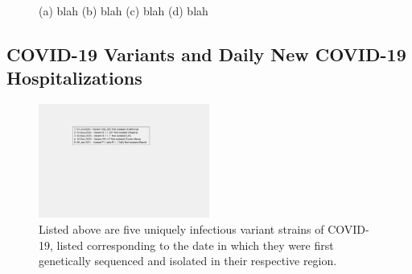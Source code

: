 \documentclass[]{article}
\begin{document}
\begin{figure}
	\caption{(a) blah (b) blah (c) blah (d) blah}
	\label{fig:foobar}
\end{figure}

\FloatBarrier
\vspace{5mm}
\subsection{COVID-19 Variants and Daily New COVID-19 Hospitalizations}

\begin{figure}[!h]
	\centering
	\includegraphics[width=0.50\textwidth]{legends/variant_strains_legend.png}
	\caption{Listed above are five uniquely infectious variant strains of COVID-19,  listed corresponding to the date in which they were first genetically sequenced and isolated in their respective region.}
	\label{fig:legends/variant_strains_legendLabel}
\end{figure}
\end{document}
